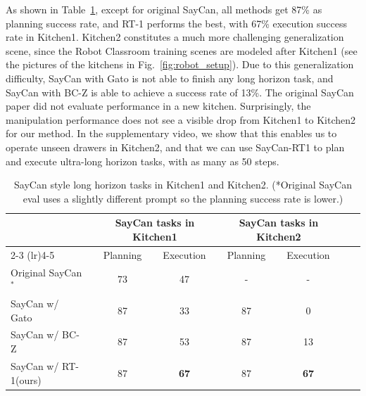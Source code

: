 \documentclass{article} %
\newcommand{\algname}{RT-1\xspace}
\begin{document}
As shown in Table~\ref{table:app_saycan}, except for original SayCan, all methods get 87\% as planning success rate, and RT-1 performs the best, with 67\% execution success rate in Kitchen1. Kitchen2 constitutes a much more challenging generalization scene, since the Robot Classroom training scenes are modeled after Kitchen1 (see the pictures of the kitchens in Fig.~\ref{fig:robot_setup}). Due to this generalization difficulty, SayCan with Gato is not able to finish any long horizon task, and SayCan with BC-Z is able to achieve a success rate of 13\%. The original SayCan paper did not evaluate performance in a new kitchen. 
Surprisingly, the manipulation performance does not see a visible drop from Kitchen1 to Kitchen2 for our method. In the supplementary video, we show that this enables us to operate unseen drawers in Kitchen2, and that we can use SayCan-RT1 to plan and execute ultra-long horizon tasks, with as many as 50 steps.

\begin{table}[h!]
\begin{center}
  \vspace{-1.0em}
  \setlength\tabcolsep{2.0pt}
  \scriptsize
  \begin{tabular}{@{}lcccccc@{}}
  \toprule
  \multicolumn{1}{l}{} & \multicolumn{2}{c}{SayCan tasks in Kitchen1} & \multicolumn{2}{c}{SayCan tasks in Kitchen2} &\\
  \cmidrule(lr){2-3} \cmidrule(lr){4-5} 
   & Planning & Execution &  Planning & Execution &  \\
  \midrule
 Original SayCan~\citep{ahn2022can}$^*$ & 73 & 47 & - & -\\
  SayCan w/ Gato~\citep{reed2022generalist} & 87 & 33 & 87 & 0\\
  SayCan w/ BC-Z~\citep{jang2022bc} & 87 & 53 & 87 & 13\\
  SayCan w/ \algname (ours) & 87 & \textbf{67} & 87 & \textbf{67}\\
  \bottomrule
  \end{tabular}
  \caption{SayCan style long horizon tasks in Kitchen1 and Kitchen2. (*Original SayCan eval uses a slightly different prompt so the planning success rate is lower.)}
  \label{table:app_saycan}
\end{center}
\end{table}
\end{document}
